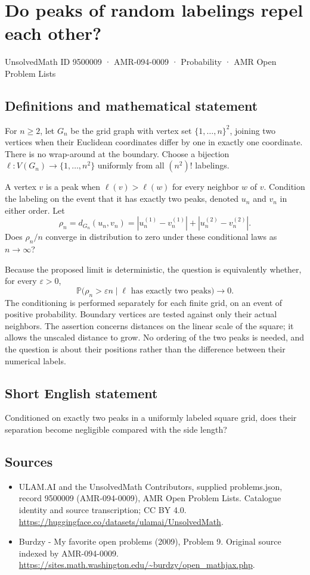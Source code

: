\documentclass[11pt,a4paper]{article}
\begin{document}
\section*{Do peaks of random labelings repel each other?}\label{9500009}
{\small UnsolvedMath ID 9500009 · AMR-094-0009 · Probability · AMR Open Problem Lists}
\subsection{Definitions and mathematical statement}
For $n\ge2$, let $G_n$ be the grid graph with vertex set $\{1,\ldots,n\}^2$, joining two vertices when their Euclidean coordinates differ by one in exactly one coordinate. There is no wrap-around at the boundary. Choose a bijection $\ell:V(G_n)\to\{1,\ldots,n^2\}$ uniformly from all $(n^2)!$ labelings.

A vertex $v$ is a peak when $\ell(v)>\ell(w)$ for every neighbor $w$ of $v$. Condition the labeling on the event that it has exactly two peaks, denoted $u_n$ and $v_n$ in either order. Let
\[
\rho_n=d_{G_n}(u_n,v_n)
=|u_n^{(1)}-v_n^{(1)}|+|u_n^{(2)}-v_n^{(2)}|.
\]
Does $\rho_n/n$ converge in distribution to zero under these conditional laws as $n\to\infty$?

Because the proposed limit is deterministic, the question is equivalently whether, for every $\varepsilon>0$,
\[
\mathbb P\bigl(\rho_n>\varepsilon n\mid
\ell\text{ has exactly two peaks}\bigr)\longrightarrow0.
\]
The conditioning is performed separately for each finite grid, on an event of positive probability. Boundary vertices are tested against only their actual neighbors. The assertion concerns distances on the linear scale of the square; it allows the unscaled distance to grow. No ordering of the two peaks is needed, and the question is about their positions rather than the difference between their numerical labels.
\subsection{Short English statement}
Conditioned on exactly two peaks in a uniformly labeled square grid, does their separation become negligible compared with the side length?
\subsection{Sources}
\begin{itemize}
\item[S1] ULAM.AI and the UnsolvedMath Contributors, supplied problems.json, record 9500009 (AMR-094-0009), AMR Open Problem Lists. Catalogue identity and source transcription; CC BY 4.0.
\url{https://huggingface.co/datasets/ulamai/UnsolvedMath}.
\item[S2] Burdzy - My favorite open problems (2009), Problem 9. Original source indexed by AMR-094-0009.
\url{https://sites.math.washington.edu/~burdzy/open_mathjax.php}.
\end{itemize}
\end{document}
